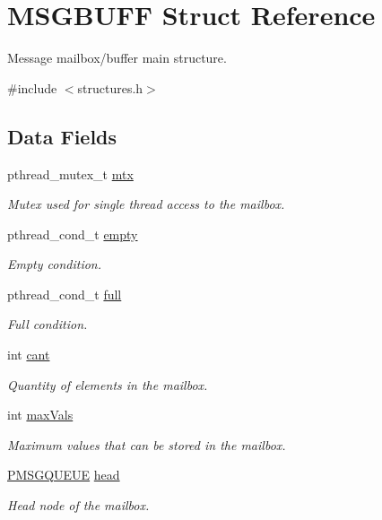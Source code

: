 \hypertarget{struct_m_s_g_b_u_f_f}{}\section{M\+S\+G\+B\+U\+FF Struct Reference}
\label{struct_m_s_g_b_u_f_f}


Message mailbox/buffer main structure.  




{\ttfamily \#include $<$structures.\+h$>$}

\subsection*{Data Fields}
\begin{DoxyCompactItemize}
\item 
pthread\+\_\+mutex\+\_\+t \hyperlink{struct_m_s_g_b_u_f_f_a2680f9fe5653a596c7e779b838180fdc}{mtx}
\begin{DoxyCompactList}\small\item\em Mutex used for single thread access to the mailbox. \end{DoxyCompactList}\item 
pthread\+\_\+cond\+\_\+t \hyperlink{struct_m_s_g_b_u_f_f_a736beea42a8a4cd01d723ac7790253f0}{empty}
\begin{DoxyCompactList}\small\item\em Empty condition. \end{DoxyCompactList}\item 
pthread\+\_\+cond\+\_\+t \hyperlink{struct_m_s_g_b_u_f_f_a3bf358e63dc2dbedca74be50f9e99dc4}{full}
\begin{DoxyCompactList}\small\item\em Full condition. \end{DoxyCompactList}\item 
int \hyperlink{struct_m_s_g_b_u_f_f_a8abe07631df9645f55b4aae910bb730c}{cant}
\begin{DoxyCompactList}\small\item\em Quantity of elements in the mailbox. \end{DoxyCompactList}\item 
int \hyperlink{struct_m_s_g_b_u_f_f_a2126c6ff8bdb52575f6db0d78381ab24}{max\+Vals}
\begin{DoxyCompactList}\small\item\em Maximum values that can be stored in the mailbox. \end{DoxyCompactList}\item 
\hyperlink{structures_8h_a4ecdada3b9e10b862f0d6d24c30b7c01}{P\+M\+S\+G\+Q\+U\+E\+UE} \hyperlink{struct_m_s_g_b_u_f_f_a0b589796ab43a65a825d58e006fd86dd}{head}
\begin{DoxyCompactList}\small\item\em Head node of the mailbox. \end{DoxyCompactList}\end{DoxyCompactItemize}


